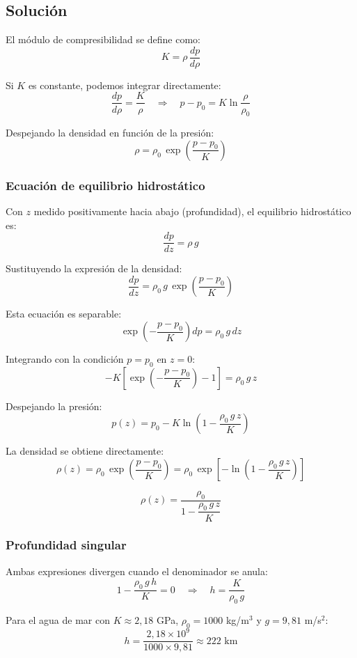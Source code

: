 \documentclass[a4paper]{article}
\begin{document}
\subsection{Solución}

El módulo de compresibilidad se define como:
$$
K = \rho\,\frac{dp}{d\rho}
$$

Si $K$ es constante, podemos integrar directamente:
$$
\frac{dp}{d\rho} = \frac{K}{\rho} \quad \Longrightarrow \quad p - p_0 = K\ln\frac{\rho}{\rho_0}
$$

Despejando la densidad en función de la presión:
$$
\rho = \rho_0\,\exp\!\left(\frac{p - p_0}{K}\right)
$$

\subsubsection{Ecuación de equilibrio hidrostático}

Con $z$ medido positivamente hacia abajo (profundidad), el equilibrio hidrostático es:
$$
\frac{dp}{dz} = \rho\, g
$$

Sustituyendo la expresión de la densidad:
$$
\frac{dp}{dz} = \rho_0\, g\,\exp\!\left(\frac{p - p_0}{K}\right)
$$

Esta ecuación es separable:
$$
\exp\!\left(-\frac{p - p_0}{K}\right) dp = \rho_0\, g\, dz
$$

Integrando con la condición $p = p_0$ en $z = 0$:
$$
-K\left[\exp\!\left(-\frac{p - p_0}{K}\right) - 1\right] = \rho_0\, g\, z
$$

Despejando la presión:
$$
\boxed{p(z) = p_0 - K\ln\!\left(1 - \frac{\rho_0\, g\, z}{K}\right)}
$$

La densidad se obtiene directamente:
$$
\rho(z) = \rho_0\,\exp\!\left(\frac{p - p_0}{K}\right) = \rho_0\,\exp\!\left[-\ln\!\left(1 - \frac{\rho_0\, g\, z}{K}\right)\right]
$$

$$
\boxed{\rho(z) = \frac{\rho_0}{1 - \dfrac{\rho_0\, g\, z}{K}}}
$$

\subsubsection{Profundidad singular}

Ambas expresiones divergen cuando el denominador se anula:
$$
1 - \frac{\rho_0\, g\, h}{K} = 0 \quad \Longrightarrow \quad \boxed{h = \frac{K}{\rho_0\, g}}
$$

Para el agua de mar con $K \approx 2{,}18$ GPa, $\rho_0 = 1000$ kg/m$^3$ y $g = 9{,}81$ m/s$^2$:
$$
h = \frac{2{,}18 \times 10^9}{1000 \times 9{,}81} \approx 222 \text{ km}
$$
\end{document}
